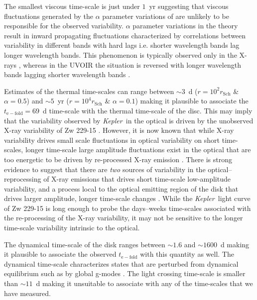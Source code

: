 \documentclass[a4paper,fleqn,usenatbib]{mnras}
\newcommand{\Kepler}{\textit{Kepler~}}
\begin{document}
The smallest viscous time-scale is just under $1$~yr suggesting that viscous fluctuations generated by the $\alpha$ parameter variations of \citet{Lyubarskii97} are unlikely to be responsible for the observed variability. $\alpha$ parameter variations in the \citet{Lyubarskii97} theory result in inward propagating fluctuations characterized by correlations between variability in different bands with hard lags i.e. shorter wavelength bands lag longer wavelength bands. This phenomenon is typically observed only in the X-rays \citep{Vaughan04,McHardy04b,Arevalo06}, whereas in the UVOIR the situation is reversed with longer wavelength bands lagging shorter wavelength bands \citep{Wanders97,Sergeev05}. 

Estimates of the thermal time-scales can range between $\sim 3$~d ($r = 10^{2} r_{\mathrm{Sch}}$ \& $\alpha = 0.5$) and $\sim 5$~yr ($r = 10^{4} r_{\mathrm{Sch}}$ \& $\alpha = 0.1$) making it plausible to associate the $t_{\mathrm{e-fold}} = 69$~d time-scale with the thermal time-scale of the disc. This may imply that the variability observed by \Kepler in the optical is driven by the unobserved X-ray variability of Zw 229-15 \citep{Krolik91}. However, it is now known that while X-ray variability drives small scale fluctuations in optical variability on short time-scales, longer time-scale large amplitude fluctuations exist in the optical that are too energetic to be driven by re-processed X-ray emission \citep{Uttley03,Arevalo09}. There is strong evidence to suggest that there are \textit{two} sources of variability in the optical--reprocessing of X-ray emissions that drives short time-scale low-amplitude variability, and a process local to the optical emitting region of the disk that drives larger amplitude, longer time-scale changes \citep{Gaskell08}. While the \Kepler light curve of Zw 229-15 is long enough to probe the days--weeks time-scales associated with the re-processing of the X-ray variability, it may not be sensitive to the longer time-scale variability intrinsic to the optical.

The dynamical time-scale of the disk ranges between $\sim 1.6$ and $\sim 1600$~d making it plausible to associate the observed $t_{\mathrm{e-fold}}$ with this quantity as well. The dynamical time-scale characterizes states that are perturbed from dynamical equilibrium such as by global g-modes \citep{ReynoldsMiller09a,ReynoldsMiller09b}. The light crossing time-scale is smaller than $\sim 11$~d making it unsuitable to associate with any of the time-scales that we have measured.  
\end{document}
